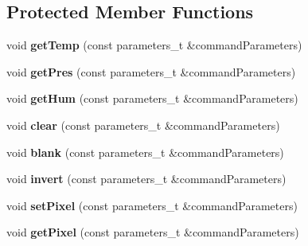 \subsection*{Protected Member Functions}
\begin{DoxyCompactItemize}
\item 
void {\bfseries get\+Temp} (const parameters\+\_\+t \&command\+Parameters)\hypertarget{class_m_q_t_tsense_h_a_t_a39ff54904e181f55b4242c800e60a95f}{}\label{class_m_q_t_tsense_h_a_t_a39ff54904e181f55b4242c800e60a95f}

\item 
void {\bfseries get\+Pres} (const parameters\+\_\+t \&command\+Parameters)\hypertarget{class_m_q_t_tsense_h_a_t_a30a58adadcb37aeccd992ca9458e17e1}{}\label{class_m_q_t_tsense_h_a_t_a30a58adadcb37aeccd992ca9458e17e1}

\item 
void {\bfseries get\+Hum} (const parameters\+\_\+t \&command\+Parameters)\hypertarget{class_m_q_t_tsense_h_a_t_ad61c2741b9e195b607bb8fe6ac9a3832}{}\label{class_m_q_t_tsense_h_a_t_ad61c2741b9e195b607bb8fe6ac9a3832}

\item 
void {\bfseries clear} (const parameters\+\_\+t \&command\+Parameters)\hypertarget{class_m_q_t_tsense_h_a_t_af05cb64126bd0591d5ca4bac5b48b111}{}\label{class_m_q_t_tsense_h_a_t_af05cb64126bd0591d5ca4bac5b48b111}

\item 
void {\bfseries blank} (const parameters\+\_\+t \&command\+Parameters)\hypertarget{class_m_q_t_tsense_h_a_t_a7736e041ad475ec82756223c90da547e}{}\label{class_m_q_t_tsense_h_a_t_a7736e041ad475ec82756223c90da547e}

\item 
void {\bfseries invert} (const parameters\+\_\+t \&command\+Parameters)\hypertarget{class_m_q_t_tsense_h_a_t_aac0a786db57adb1f70f4932bc3800cff}{}\label{class_m_q_t_tsense_h_a_t_aac0a786db57adb1f70f4932bc3800cff}

\item 
void {\bfseries set\+Pixel} (const parameters\+\_\+t \&command\+Parameters)\hypertarget{class_m_q_t_tsense_h_a_t_a2c2134187487882f89a850b6a7f010ec}{}\label{class_m_q_t_tsense_h_a_t_a2c2134187487882f89a850b6a7f010ec}

\item 
void {\bfseries get\+Pixel} (const parameters\+\_\+t \&command\+Parameters)\hypertarget{class_m_q_t_tsense_h_a_t_aac431239ec91b0c7647fc90f2780d5e3}{}\label{class_m_q_t_tsense_h_a_t_aac431239ec91b0c7647fc90f2780d5e3}


\end{DoxyCompactItemize}
